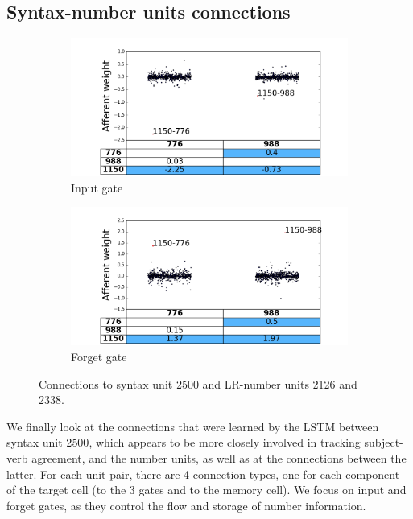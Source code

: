 \subsection{Syntax-number units connections}

\begin{figure}[t]
    \centering
    \begin{subfigure}{0.49\textwidth}
            \centering
            \includegraphics[width=\textwidth]{Figures/gate_Input_afferent_interactions.png}
            \caption{Input gate}
            \label{fig:interaction-input}
    \end{subfigure}
    \begin{subfigure}{0.49\textwidth}
           \centering
          \includegraphics[width=\textwidth]{Figures/gate_Forget_afferent_interactions.png}
          \caption{Forget gate}
          \label{fig:interaction-forget}
    \end{subfigure}
\caption{Connections to syntax unit \unit{2}{500} and LR-number units \unit{2}{126} and \unit{2}{338}. }
\label{fig:interaction}
\end{figure}

We finally look at the connections that were learned by the LSTM
between syntax unit \unit{2}{500}, which appears to be more closely involved in
tracking subject-verb agreement, and the number units, as well as at
the connections between the latter. For each unit pair, there are 4
connection types, one for each component of the target cell (to the 3
gates and to the memory cell). We focus on input and forget gates, as they control the flow and storage of number information.

